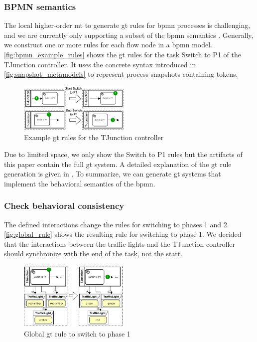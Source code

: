 \documentclass{jot}
\begin{document}
\subsubsection{BPMN semantics}
The local higher-order \gls*{mt} to generate \gls*{gt} rules for \gls*{bpmn} processes is challenging, and we are currently only supporting a subset of the \gls*{bpmn} semantics \cite{krauterFormalizationAnalysisBPMN2022}.
Generally, we construct one or more rules for each flow node in a \gls*{bpmn} model.
\autoref{fig:bpmn_example_rules} shows the \gls*{gt} rules for the task \textsf{Switch to P1} of the TJunction controller.
It uses the concrete syntax introduced in \cref{fig:snapshot_metamodels} to represent process snapshots containing tokens.

\begin{figure}[h]
    \centering
    \includegraphics[width=0.475\textwidth]{figures/bpmn_rules.pdf}
    \caption{Example \gls*{gt} rules for the TJunction controller}
    \label{fig:bpmn_example_rules}
\end{figure}

Due to limited space, we only show the \textsf{Switch to P1} rules but the artifacts of this paper \cite{krauterArtifactsBehavioralConsistency2022} contain the full \gls*{gt} system.
A detailed explanation of the \gls*{gt} rule generation is given in \cite{krauterFormalizationAnalysisBPMN2022}.
To summarize, we can generate \gls*{gt} systems that implement the behavioral semantics of the \gls*{bpmn}.


\subsubsection{Check behavioral consistency}
The defined interactions change the rules for switching to phases 1 and 2.
\autoref{fig:global_rule} shows the resulting rule for switching to phase 1.
We decided that the interactions between the traffic lights and the TJunction controller should synchronize with the end of the task, not the start.

\begin{figure}[h]
    \centering
    \includegraphics[width=0.475\textwidth]{figures/global_rule.pdf}
    \caption{Global \gls*{gt} rule to switch to phase 1}
    \label{fig:global_rule}
\end{figure}
\end{document}
